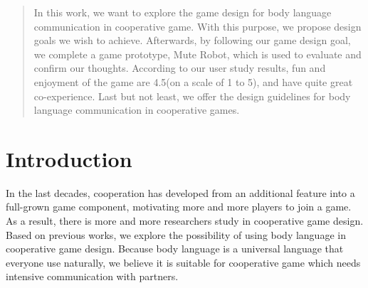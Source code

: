 \documentclass{sigchi}
\begin{document}
\begin{abstract}


In this work, we want to explore the game design for body language communication in cooperative game. With this purpose, we propose design goals we wish to achieve. Afterwards, by following our game design goal, we complete a game prototype, Mute Robot, which is used to evaluate and confirm our thoughts. According to our user study results, fun and enjoyment of the game are 4.5(on a scale of 1 to 5), and have quite great co-experience. Last but not least, we offer the design guidelines for body language communication in cooperative games.


\end{abstract}




\section{Introduction}

In the last decades, cooperation has developed from an additional feature into a full-grown game component, motivating more and more players to join a game. As a result, there is more and more researchers study in cooperative game design. Based on previous works, we explore the possibility of using body language in cooperative game design. Because body language is a universal language that everyone use naturally, we believe it is suitable for cooperative game which needs intensive communication with partners.
\end{document}
